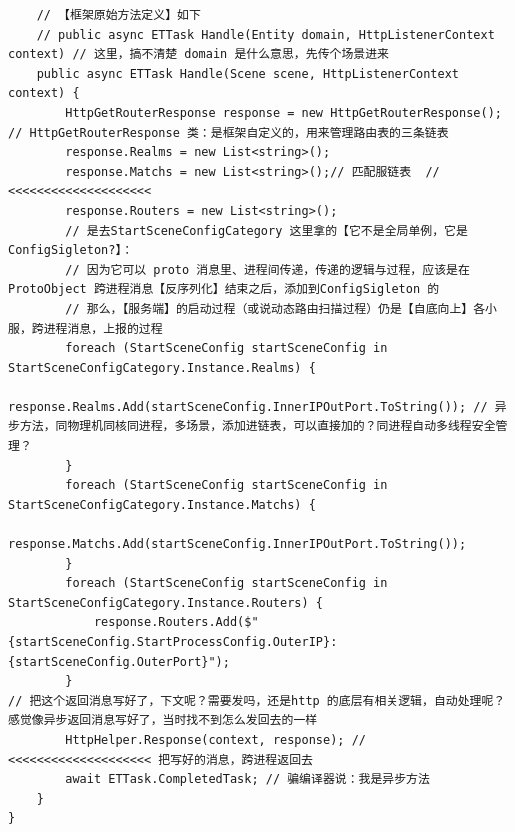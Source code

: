 \documentclass[9pt, b5paper]{article}
\begin{document}
\begin{itemize}
\begin{verbatim}
    // 【框架原始方法定义】如下
    // public async ETTask Handle(Entity domain, HttpListenerContext context) // 这里，搞不清楚 domain 是什么意思，先传个场景进来
    public async ETTask Handle(Scene scene, HttpListenerContext context) {
        HttpGetRouterResponse response = new HttpGetRouterResponse(); // HttpGetRouterResponse 类：是框架自定义的，用来管理路由表的三条链表
        response.Realms = new List<string>();
        response.Matchs = new List<string>();// 匹配服链表  // <<<<<<<<<<<<<<<<<<<< 
        response.Routers = new List<string>();
        // 是去StartSceneConfigCategory 这里拿的【它不是全局单例，它是ConfigSigleton?】：
        // 因为它可以 proto 消息里、进程间传递，传递的逻辑与过程，应该是在ProtoObject 跨进程消息【反序列化】结束之后，添加到ConfigSigleton 的
        // 那么，【服务端】的启动过程（或说动态路由扫描过程）仍是【自底向上】各小服，跨进程消息，上报的过程
        foreach (StartSceneConfig startSceneConfig in StartSceneConfigCategory.Instance.Realms) {
            response.Realms.Add(startSceneConfig.InnerIPOutPort.ToString()); // 异步方法，同物理机同核同进程，多场景，添加进链表，可以直接加的？同进程自动多线程安全管理？
        }
        foreach (StartSceneConfig startSceneConfig in StartSceneConfigCategory.Instance.Matchs) {
            response.Matchs.Add(startSceneConfig.InnerIPOutPort.ToString());
        }
        foreach (StartSceneConfig startSceneConfig in StartSceneConfigCategory.Instance.Routers) {
            response.Routers.Add($"{startSceneConfig.StartProcessConfig.OuterIP}:{startSceneConfig.OuterPort}");
        }
// 把这个返回消息写好了，下文呢？需要发吗，还是http 的底层有相关逻辑，自动处理呢？感觉像异步返回消息写好了，当时找不到怎么发回去的一样
        HttpHelper.Response(context, response); // <<<<<<<<<<<<<<<<<<<< 把写好的消息，跨进程返回去
        await ETTask.CompletedTask; // 骗编译器说：我是异步方法
    }
}
\end{verbatim}
\end{itemize}
\end{document}
